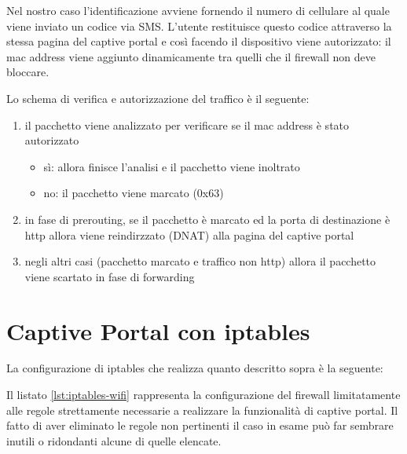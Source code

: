 Nel nostro caso l'identificazione avviene fornendo il numero di cellulare al
quale viene inviato un codice via SMS. L'utente restituisce questo codice
attraverso la stessa pagina del captive portal e cos\`i facendo il dispositivo
viene autorizzato: il mac address viene aggiunto dinamicamente tra quelli
che il firewall non deve bloccare.

Lo schema di verifica e autorizzazione del traffico è il seguente:
\begin{enumerate}
    \item il pacchetto viene analizzato per verificare se il mac
    address è stato autorizzato
    \begin{itemize}
        \item sì: allora finisce l'analisi e il pacchetto viene inoltrato
        \item no: il pacchetto viene marcato (0x63)
    \end{itemize}
    \item in fase di prerouting, se il pacchetto è marcato ed la porta di
    destinazione è http allora viene reindirzzato (DNAT) alla pagina del
    captive portal
    \item negli altri casi (pacchetto marcato e traffico non http) allora il
    pacchetto viene scartato in fase di forwarding
\end{enumerate}

\section{Captive Portal con iptables}
\label{lab:captive}
La configurazione di iptables che realizza quanto descritto sopra è la
seguente:

Il listato \ref{lst:iptables-wifi} rappresenta la configurazione del
firewall limitatamente alle regole strettamente necessarie a realizzare la
funzionalità di captive portal. Il fatto di aver eliminato le regole non
pertinenti il caso in esame può far sembrare inutili o ridondanti alcune di
quelle elencate.

